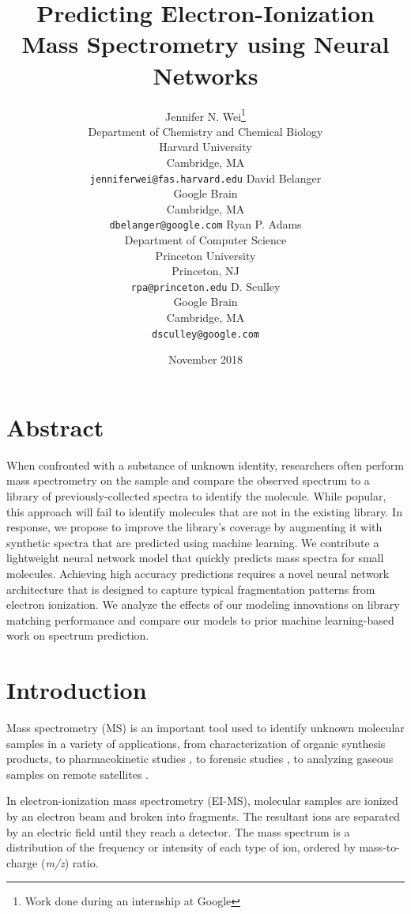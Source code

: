 \documentclass{article}
\title{Predicting Electron-Ionization Mass Spectrometry using Neural Networks}
\author{ Jennifer N. Wei\thanks{Work done during an internship at Google} \\
  Department of Chemistry and Chemical Biology\\
  Harvard University\\
  Cambridge, MA \\
  \texttt{jenniferwei@fas.harvard.edu} 
  \And
  David Belanger \\
  Google Brain \\
  Cambridge, MA\\
  \texttt{dbelanger@google.com}
  \And
  Ryan P. Adams \\
  Department of Computer Science\\
  Princeton University\\
  Princeton, NJ\\
  \texttt{rpa@princeton.edu}
  \And
  D. Sculley \\
  Google Brain\\
  Cambridge, MA\\
  \texttt{dsculley@google.com}
  }
\date{November 2018}
\begin{document}
\maketitle

\section*{Abstract}
When confronted with a substance of unknown identity, researchers often perform mass spectrometry on the sample and compare the observed spectrum to a library of previously-collected spectra to identify the molecule. While popular, this approach will fail to identify molecules that are not in the existing library. In response, we propose to improve the library’s coverage by augmenting it with synthetic spectra that are predicted using machine learning. We contribute a lightweight neural network model that quickly predicts mass spectra for small molecules. Achieving high accuracy predictions requires a novel neural network architecture that is designed to capture typical fragmentation patterns from electron ionization. We analyze the effects of our modeling innovations on library matching performance and compare our models to prior machine learning-based work on spectrum prediction.


\section{Introduction}

Mass spectrometry (MS) is an important tool used to identify unknown molecular samples in a variety of applications, from characterization of organic synthesis products, to pharmacokinetic studies \cite{massspec_pharmakinetics}, to forensic studies \cite{Zhou2017LatentFingerprints}, to analyzing gaseous samples on remote satellites \cite{Petrie_ions_in_space}.

In electron-ionization mass spectrometry (EI-MS), molecular samples are ionized by an electron beam and broken into fragments. The resultant ions are separated by an electric field until they reach a detector. The mass spectrum is a distribution of the frequency or intensity of each type of ion, ordered by mass-to-charge (\textit{m/z}) ratio.
\end{document}
